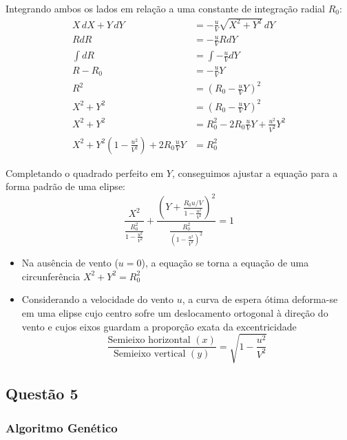 \documentclass[a4paper, 12pt]{article}%
\begin{document}
Integrando ambos os lados em relação a uma constante de integração radial $R_0$:
\begin{align}
    X \, dX + Y \, dY &= -\frac{u}{V}\sqrt{X^2 + Y^2} \, dY \\
    R dR &= -\frac{u}{V} R dY \\ 
    \int dR &= \int -\frac{u}{V} dY \\
    R - R_0 &= -\frac{u}{V} Y \\
    R^2 &= \left(R_0 - \frac{u}{V}Y\right)^2 \\
    X^2 + Y^2 &= \left(R_0 - \frac{u}{V}Y\right)^2 \\
    X^2 + Y^2 &= R_0^2 - 2R_0\frac{u}{V}Y + \frac{u^2}{V^2}Y^2 \\
    X^2 + Y^2\left(1 - \frac{u^2}{V^2}\right) + 2R_0\frac{u}{V}Y &= R_0^2
\end{align}

Completando o quadrado perfeito em $Y$, conseguimos ajustar a equação para a forma padrão de uma elipse:
\begin{equation}
    \frac{X^2}{\frac{R_0^2}{1 - \frac{u^2}{V^2}}} + \frac{\left(Y + \frac{R_0 u/V}{1 - \frac{u^2}{V^2}}\right)^2}{\frac{R_0^2}{\left(1 - \frac{u^2}{V^2}\right)^2}} = 1
\end{equation}

\begin{itemize}
    \item Na ausência de vento ($u = 0$), a equação se torna a equação de uma circunferência $X^2 + Y^2 = R_0^2$
    \item Considerando a velocidade do vento $u$, a curva de espera ótima deforma-se em uma elipse cujo centro sofre um deslocamento ortogonal à direção do vento e cujos eixos guardam a proporção exata da excentricidade
    \begin{equation}
        \frac{\text{Semieixo horizontal } (x)}{\text{Semieixo vertical } (y)} = \sqrt{1 - \frac{u^2}{V^2}}
    \end{equation}
\end{itemize}

\newpage

\subsection*{Questão 5}

\subsubsection*{Algoritmo Genético}
\end{document}
